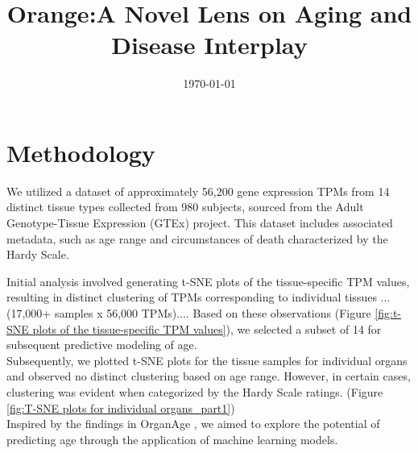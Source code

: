 \documentclass[twocolumn]{article}
\title{\textbf{Orange:A Novel Lens on Aging and Disease Interplay}}
\author{}
\date{\today}
\begin{document}
\maketitle

\section{Methodology}

We utilized a dataset of approximately 56,200 gene expression TPMs from 14 distinct tissue types collected from 980 subjects, sourced from the Adult Genotype-Tissue Expression (GTEx) project. \cite{gtex_bulk_expression} This dataset includes associated metadata, such as age range and circumstances of death characterized by the Hardy Scale. \cite{gtex_metadata}

Initial analysis involved generating t-SNE plots of the tissue-specific TPM values, resulting in distinct clustering of TPMs corresponding to individual tissues ...(17,000+ samples x 56,000 TPMs).... Based on these observations (Figure \ref{fig:t-SNE plots of the tissue-specific TPM values}), we selected a subset of 14 for subsequent predictive modeling of age. \\

Subsequently, we plotted t-SNE plots for the tissue samples for individual organs and observed no distinct clustering based on age range. However, in certain cases, clustering was evident when categorized by the Hardy Scale ratings. (Figure \ref{fig:T-SNE plots for individual organs_part1}) \\

Inspired by the findings in OrganAge \cite{organage2023} , we aimed to explore the potential of predicting age through the application of machine learning models.\\
\end{document}
